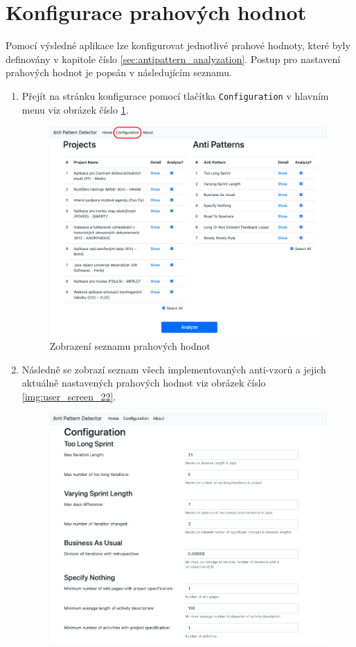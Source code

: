 \documentclass[czech,DP]{thesiskiv}
\begin{document}
\section{Konfigurace prahových hodnot}
Pomocí výsledné aplikace lze konfigurovat jednotlivé prahové hodnoty, které byly definovány v kapitole číslo \ref{sec:antipattern_analyzation}. Postup pro nastavení prahových hodnot je popsán v následujícím seznamu.
\begin{enumerate}
    \item Přejít na stránku konfigurace pomocí tlačítka \texttt{Configuration} v hlavním menu viz obrázek číslo \ref{img:user_screen_11}.
    \begin{figure}[!htb]
    \centering
    \includegraphics[width=350pt]{img/user_screen_11.png}
    \caption{Zobrazení seznamu prahových hodnot}
    \label{img:user_screen_11}
\end{figure}
\FloatBarrier
    \item Následně se zobrazí seznam všech implementovaných anti-vzorů a jejich aktuálně nastavených prahových hodnot viz obrázek číslo \ref{img:user_screen_22}.
    \begin{figure}[!htb]
    \centering
    \includegraphics[width=350pt]{img/user_screen_22.png}

\end{figure}
\end{enumerate}
\end{document}

